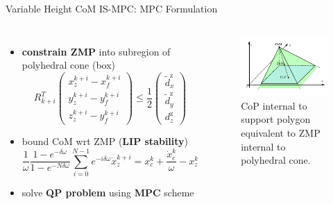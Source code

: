 \documentclass[10pt]{beamer}
\begin{document}
\begin{frame}{Variable Height CoM IS-MPC: MPC Formulation}
  \begin{columns}[c,onlytextwidth]
			\begin{itemize}
			  \item \textbf{constrain ZMP} into subregion of polyhedral cone (box)
					\begin{equation*}
						R_{k+i}^T
						\begin{pmatrix}
							x_z^{k+i} - x_f^{k+i} \\
							y_z^{k+i} - y_f^{k+i} \\
							z_z^{k+i} - y_f^{k+i}
						\end{pmatrix}
						\le
						\frac{1}{2}
						\begin{pmatrix}
							\tilde{d}_x^\text{z} \\
							\tilde{d}_y^\text{z} \\
							d_z^\text{z}
						\end{pmatrix}
					\end{equation*}
				\item bound CoM wrt ZMP (\textbf{LIP stability})
					\begin{equation*}
						\frac{1}{\omega}\frac{1-e^{-\delta\omega}}{1-e^{-N\delta\omega}}
							\sum_{i=0}^{N-1} e^{-i\delta\omega} \dot{x}_z^{k+i} =
							x_c^k + \frac{\dot{x}_c^k}{\omega} - x_z^k
					\end{equation*}
			  \item solve \textbf{QP problem} using \textbf{MPC} scheme
			\end{itemize}
		  \begin{figure}
				\centering
				\includegraphics[width=\textwidth]{figures/balance3d.pdf}
				\caption{CoP internal to support polygon equivalent to ZMP internal
				    to polyhedral cone.}
				\label{fig:balance3d}
      \end{figure}
	\end{columns}
\end{frame}
\end{document}
